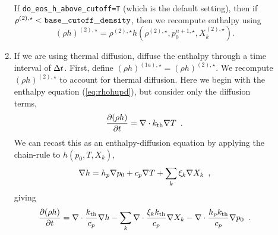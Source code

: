 \begin{description}
\begin{enumerate}
\begin{enumerate}
\begin{description}
\end{description}

\end{enumerate}

If {\tt do\_eos\_h\_above\_cutoff=T} (which is the default setting), then if
$\rho^{(2),\star} < {\tt base\_cutoff\_density}$, then we recompute enthalpy using
\begin{equation}
(\rho h)^{(2),\star} = \rho^{(2),\star}h\left(\rho^{(2),\star},p_0^{n+1,\star},X_k^{(2),\star}\right).
\end{equation}



\item If we are using thermal diffusion, diffuse the enthalpy through a time interval of 
$\Delta t$.  First, define $(\rho h)^{(1a),\star} = (\rho h)^{(2),\star}$.  We recompute
$(\rho h)^{(2),\star}$ to account for thermal diffusion.  Here we begin
with the enthalpy equation (\ref{eq:rhohupd}), but consider only the 
diffusion terms,
\begin{equation}
  \frac{\partial (\rho h)}{\partial t}  = 
 \nabla\cdot k_{\rm th}\nabla T 
\enskip . \label{eq:rhohupdthermal} 
  \end{equation}
We can recast this as an enthalpy-diffusion equation by applying the
chain-rule to $h(p_0,T,X_k)$,
\begin{equation}
\nabla h = h_p \nabla p_0 + c_p \nabla T + \sum_k \xi_k \nabla X_k \enskip ,
\end{equation}
giving
\begin{equation}
  \frac{\partial (\rho h)}{\partial t}  = 
 \nabla\cdot \frac{k_{\rm th}}{c_p}\nabla h -  
 \sum_k \nabla\cdot \frac{\xi_k k_{\rm th}}{c_p}\nabla X_k -
 \nabla\cdot \frac{h_p k_{\rm th}}{c_p}\nabla p_0 
\enskip . \label{eq:rhohupdthermal2} 
  \end{equation}


\end{enumerate}
\end{description}
